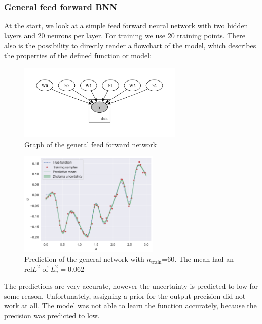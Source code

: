 \documentclass{article}
\newcommand{\nt}{$n_\text{train}$}
\begin{document}
\subsubsection{General feed forward BNN}
At the start, we look at a simple feed forward neural network with two hidden layers and 20 neurons per layer. For training we use 20 training points. There also is the possibility to directly render a flowchart of the model, which describes the properties of the defined function or model:
\begin{figure}[htbp!]
    \centering
    \includegraphics[width=0.7\textwidth]{plots/bnn_oscilator1_pinn.pdf}
    \caption{Graph of the general feed forward network}
    \label{fig:training_samples}
\end{figure}
\begin{figure}[htbp!]
    \centering
    \includegraphics[width=0.6\textwidth]{plots/BNN/oscilator1_60_[20, 20, 1].png}
    \caption{Prediction of the general network with \nt=60. The mean had an rel$L^2$ of $L^2_u=0.062$}
    \label{fig:training_samples}
\end{figure}
The predictions are very accurate, however the uncertainty is predicted to low for some reason. Unfortunately, assigning a prior for the output precision did not work at all. The model was not able to learn the function accurately, because the precision was predicted to low.
\end{document}
